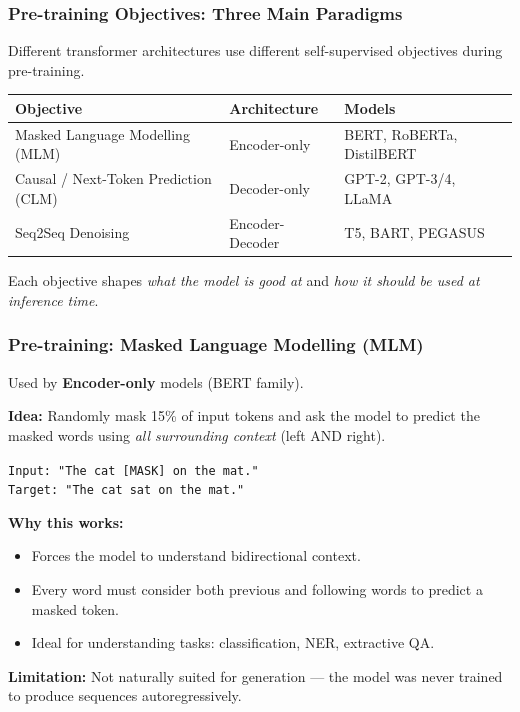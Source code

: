 \begin{frame}[fragile]\frametitle{Pre-training Objectives: Three Main Paradigms}

Different transformer architectures use different self-supervised objectives during pre-training.

\begin{center}
\begin{tabular}{|p{2.8cm}|p{3.2cm}|p{3.2cm}|}
\hline
\textbf{Objective} & \textbf{Architecture} & \textbf{Models} \\
\hline
Masked Language Modelling (MLM) & Encoder-only & BERT, RoBERTa, DistilBERT \\
\hline
Causal / Next-Token Prediction (CLM) & Decoder-only & GPT-2, GPT-3/4, LLaMA \\
\hline
Seq2Seq Denoising & Encoder-Decoder & T5, BART, PEGASUS \\
\hline
\end{tabular}
\end{center}

Each objective shapes \emph{what the model is good at} and \emph{how it should be used at inference time}.

\end{frame}

\begin{frame}[fragile]\frametitle{Pre-training: Masked Language Modelling (MLM)}

Used by \textbf{Encoder-only} models (BERT family).

\textbf{Idea:} Randomly mask 15\% of input tokens and ask the model to predict the masked words using \emph{all surrounding context} (left AND right).

\begin{center}
\texttt{Input:  "The cat [MASK] on the mat."} \\
\texttt{Target: "The cat sat  on the mat."}
\end{center}

\textbf{Why this works:}
\begin{itemize}
\item Forces the model to understand bidirectional context.
\item Every word must consider both previous and following words to predict a masked token.
\item Ideal for understanding tasks: classification, NER, extractive QA.
\end{itemize}

\textbf{Limitation:} Not naturally suited for generation --- the model was never trained to produce sequences autoregressively.

\end{frame}

